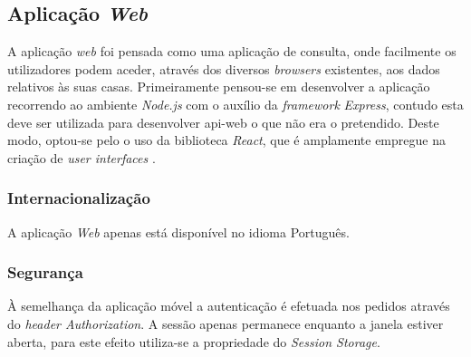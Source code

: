 \subsection{Aplicação \textit{Web}}

A aplicação \textit{web} foi pensada como uma aplicação de consulta, onde facilmente os utilizadores podem aceder, através dos diversos \textit{browsers} existentes, aos dados relativos às suas casas. Primeiramente pensou-se em desenvolver a aplicação recorrendo ao ambiente \textit{Node.js} com o auxílio da \textit{framework} \textit{Express}, contudo esta deve ser utilizada para desenvolver \gls{api-web} o que não era o pretendido. Deste modo, optou-se pelo o uso da biblioteca \textit{React}, que é amplamente empregue na criação de \textit{user interfaces} \cite{ReactvsExpress:web}.


\subsubsection{Internacionalização}

A aplicação \textit{Web} apenas está disponível no idioma Português.


\subsubsection{Segurança}

À semelhança da aplicação móvel a autenticação é efetuada nos pedidos através do \textit{header Authorization}. A sessão apenas permanece enquanto a janela estiver aberta, para este efeito utiliza-se a propriedade do \textit{Session Storage}.
